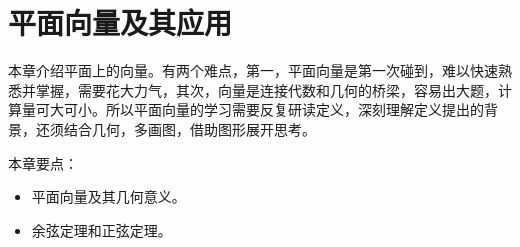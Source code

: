\chapter{平面向量及其应用}

本章介绍平面上的向量。有两个难点，第一，平面向量是第一次碰到，难以快速熟悉并掌握，需要花大力气，其次，向量是连接代数和几何的桥梁，容易出大题，计算量可大可小。所以平面向量的学习需要反复研读定义，深刻理解定义提出的背景，还须结合几何，多画图，借助图形展开思考。

本章要点：
\begin{itemize}
    \item 平面向量及其几何意义。
    \item 余弦定理和正弦定理。
\end{itemize}

\newpage


\newpage


\newpage


\newpage


\newpage





